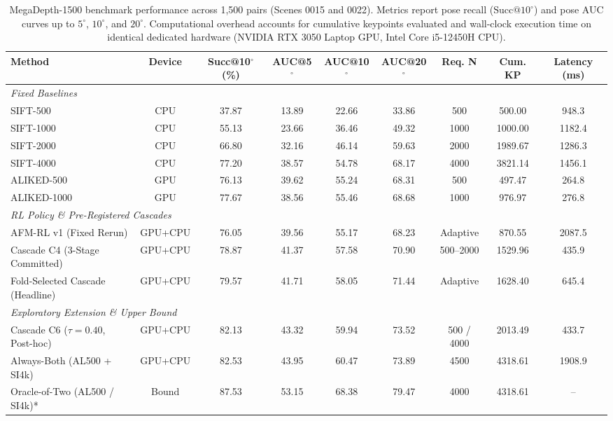 \begin{table}[t]
\centering
\caption{MegaDepth-1500 benchmark performance across 1,500 pairs (Scenes 0015 and 0022). Metrics report pose recall ($\text{Succ}@10^\circ$) and pose AUC curves up to $5^\circ$, $10^\circ$, and $20^\circ$. Computational overhead accounts for cumulative keypoints evaluated and wall-clock execution time on identical dedicated hardware (NVIDIA RTX 3050 Laptop GPU, Intel Core i5-12450H CPU).}
\label{tab:megadepth_main}
\small
\begin{tabular}{lcccccccc}
\hline
\textbf{Method} & \textbf{Device} & \textbf{Succ@10$^\circ$ (\%)} & \textbf{AUC@5$^\circ$} & \textbf{AUC@10$^\circ$} & \textbf{AUC@20$^\circ$} & \textbf{Req. N} & \textbf{Cum. KP} & \textbf{Latency (ms)} \\
\hline
\multicolumn{9}{l}{\textit{Fixed Baselines}} \\
SIFT-500 & CPU & 37.87 & 13.89 & 22.66 & 33.86 & 500 & 500.00 & 948.3 \\
SIFT-1000 & CPU & 55.13 & 23.66 & 36.46 & 49.32 & 1000 & 1000.00 & 1182.4 \\
SIFT-2000 & CPU & 66.80 & 32.16 & 46.14 & 59.63 & 2000 & 1989.67 & 1286.3 \\
SIFT-4000 & CPU & 77.20 & 38.57 & 54.78 & 68.17 & 4000 & 3821.14 & 1456.1 \\
ALIKED-500 & GPU & 76.13 & 39.62 & 55.24 & 68.31 & 500 & 497.47 & 264.8 \\
ALIKED-1000 & GPU & 77.67 & 38.56 & 55.46 & 68.68 & 1000 & 976.97 & 276.8 \\
\hline
\multicolumn{9}{l}{\textit{RL Policy \& Pre-Registered Cascades}} \\
AFM-RL v1 (Fixed Rerun) & GPU+CPU & 76.05 & 39.56 & 55.17 & 68.23 & Adaptive & 870.55 & 2087.5 \\
Cascade C4 (3-Stage Committed) & GPU+CPU & 78.87 & 41.37 & 57.58 & 70.90 & 500--2000 & 1529.96 & 435.9 \\
Fold-Selected Cascade (Headline) & GPU+CPU & 79.57 & 41.71 & 58.05 & 71.44 & Adaptive & 1628.40 & 645.4 \\
\hline
\multicolumn{9}{l}{\textit{Exploratory Extension \& Upper Bound}} \\
Cascade C6 ($\tau=0.40$, Post-hoc) & GPU+CPU & 82.13 & 43.32 & 59.94 & 73.52 & 500 / 4000 & 2013.49 & 433.7 \\
Always-Both (AL500 + SI4k) & GPU+CPU & 82.53 & 43.95 & 60.47 & 73.89 & 4500 & 4318.61 & 1908.9 \\
Oracle-of-Two (AL500 / SI4k)* & Bound & 87.53 & 53.15 & 68.38 & 79.47 & 4000 & 4318.61 & -- \\
\hline
\end{tabular}
\end{table}

